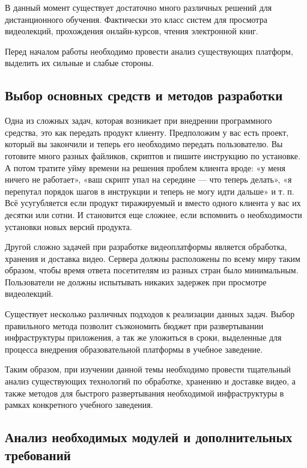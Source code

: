 В данный момент существует достаточно много различных решений для дистанционного обучения.
Фактически это класс систем для просмотра видеолекций, прохождения онлайн-курсов,
чтения электронной книг.

Перед началом работы необходимо провести анализ существующих платформ,
выделить их сильные и слабые стороны.


\subsection{Выбор основных средств и методов разработки}

Одна из сложных задач, которая возникает при внедрении программного средства,
это как передать продукт клиенту. Предположим у вас есть проект, который вы закончили
и теперь его необходимо передать пользователю. Вы готовите много разных файликов,
скриптов и пишите инструкцию по установке. А потом тратите уйму времени на решения
проблем клиента вроде: «у меня ничего не работает», «ваш скрипт упал на середине —
что теперь делать», «я перепутал порядок шагов в инструкции и теперь не могу идти дальше»
и т. п. Всё усугубляется если продукт тиражируемый и вместо одного клиента у вас их десятки или
сотни. И становится еще сложнее, если вспомнить о необходимости установки новых версий продукта.

Другой сложно задачей при разработке видеоплатформы является обработка, хранения и доставка
видео. Сервера должны расположены по всему миру таким образом, чтобы время ответа посетителям
из разных стран было минимальным. Пользователи не должны испытывать никаких задержек при
просмотре видеолекций.

Существует несколько различных подходов к реализации данных задач.
Выбор правильного метода позволит съэкономить бюджет при развертывании инфраструктуры
приложения, а так же уложиться в сроки, выделенные для процесса внедрения образовательной
платформы в учебное заведение.

Таким образом, при изучении данной темы необходимо провести тщательный
анализ существующих технологий по обработке, хранению и доставке видео, а также методов для
быстрого развертывания необходимой инфраструктуры в рамках конкретного учебного заведения.

\subsection{Анализ необходимых модулей и дополнительных требований}

